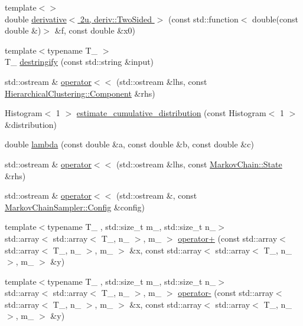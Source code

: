 \begin{DoxyCompactItemize}
\item 
{\footnotesize template$<$$>$ }\\double \hyperlink{namespaceeos_ab2d67e5e2a1c2f809d76dcfc4ec7f99a}{derivative$<$ 2u, deriv::TwoSided $>$} (const std::function$<$ double(const double \&)$>$ \&f, const double \&x0)
\item 
{\footnotesize template$<$typename T\_\- $>$ }\\T\_\- \hyperlink{namespaceeos_ad3134beb65a048a00ed3607d0af90202}{destringify} (const std::string \&input)
\item 
std::ostream \& \hyperlink{namespaceeos_a2d7ef50009f9368c73d5056eab3ec21d}{operator$<$$<$} (std::ostream \&lhs, const \hyperlink{classeos_1_1HierarchicalClustering_1_1Component}{HierarchicalClustering::Component} \&rhs)
\item 
Histogram$<$ 1 $>$ \hyperlink{namespaceeos_a163f4d3cb33f72cf2ffc42f8cee7db0e}{estimate\_\-cumulative\_\-distribution} (const Histogram$<$ 1 $>$ \&distribution)
\item 
double \hyperlink{namespaceeos_a2e8644357d2012ca279f49ab0037b9ea}{lambda} (const double \&a, const double \&b, const double \&c)
\item 
std::ostream \& \hyperlink{namespaceeos_a71b35e367b59b8fe16e6111d0851445f}{operator$<$$<$} (std::ostream \&lhs, const \hyperlink{structeos_1_1MarkovChain_1_1State}{MarkovChain::State} \&rhs)
\item 
std::ostream \& \hyperlink{namespaceeos_a7642c201b3971d5a2d8e71b6d25cd339}{operator$<$$<$} (std::ostream \&, const \hyperlink{classeos_1_1MarkovChainSampler_1_1Config}{MarkovChainSampler::Config} \&config)
\item 
{\footnotesize template$<$typename T\_\- , std::size\_\-t m\_\-, std::size\_\-t n\_\-$>$ }\\std::array$<$ std::array$<$ T\_\-, n\_\- $>$, m\_\- $>$ \hyperlink{namespaceeos_a0e3f5e761fbf126d8fcda142fed73318}{operator+} (const std::array$<$ std::array$<$ T\_\-, n\_\- $>$, m\_\- $>$ \&x, const std::array$<$ std::array$<$ T\_\-, n\_\- $>$, m\_\- $>$ \&y)
\item 
{\footnotesize template$<$typename T\_\- , std::size\_\-t m\_\-, std::size\_\-t n\_\-$>$ }\\std::array$<$ std::array$<$ T\_\-, n\_\- $>$, m\_\- $>$ \hyperlink{namespaceeos_acbf11d2b07d36a4c4a3abb8d58bceea3}{operator-\/} (const std::array$<$ std::array$<$ T\_\-, n\_\- $>$, m\_\- $>$ \&x, const std::array$<$ std::array$<$ T\_\-, n\_\- $>$, m\_\- $>$ \&y)
\item 

\end{DoxyCompactItemize}
